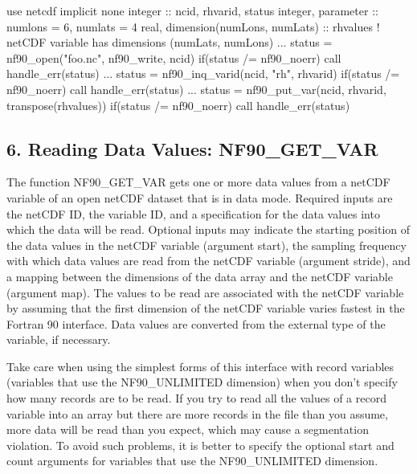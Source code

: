 \begin{DoxyCode}
\textcolor{keywordtype}{use }netcdf
\textcolor{keywordtype}{implicit none}
\textcolor{keywordtype}{integer}                           :: ncid, rhvarid, status
\textcolor{keywordtype}{integer}, \textcolor{keywordtype}{parameter}                :: numlons = 6, numlats = 4
\textcolor{keywordtype}{real}, \textcolor{keywordtype}{dimension(numLons, numLats)} :: rhvalues
\textcolor{comment}{! netCDF variable has dimensions (numLats, numLons)}
...
status = nf90\_open(\textcolor{stringliteral}{"foo.nc"}, nf90\_write, ncid)
\textcolor{keywordflow}{if}(status /= nf90\_noerr) \textcolor{keyword}{call }handle\_err(status)
...
status = nf90\_inq\_varid(ncid, \textcolor{stringliteral}{"rh"}, rhvarid)
\textcolor{keywordflow}{if}(status /= nf90\_noerr) \textcolor{keyword}{call }handle\_err(status)
...
status = nf90\_put\_var(ncid, rhvarid, transpose(rhvalues))
\textcolor{keywordflow}{if}(status /= nf90\_noerr) \textcolor{keyword}{call }handle\_err(status)
\end{DoxyCode}
\hypertarget{f90-variables_f90-reading-data-values-nf90_get_var}{}\subsection{6. Reading Data Values\+: N\+F90\+\_\+\+G\+E\+T\+\_\+\+V\+A\+R }\label{f90-variables_f90-reading-data-values-nf90_get_var}
The function N\+F90\+\_\+\+G\+E\+T\+\_\+\+V\+AR gets one or more data values from a net\+C\+DF variable of an open net\+C\+DF dataset that is in data mode. Required inputs are the net\+C\+DF ID, the variable ID, and a specification for the data values into which the data will be read. Optional inputs may indicate the starting position of the data values in the net\+C\+DF variable (argument start), the sampling frequency with which data values are read from the net\+C\+DF variable (argument stride), and a mapping between the dimensions of the data array and the net\+C\+DF variable (argument map). The values to be read are associated with the net\+C\+DF variable by assuming that the first dimension of the net\+C\+DF variable varies fastest in the Fortran 90 interface. Data values are converted from the external type of the variable, if necessary.

Take care when using the simplest forms of this interface with record variables (variables that use the N\+F90\+\_\+\+U\+N\+L\+I\+M\+I\+T\+ED dimension) when you don’t specify how many records are to be read. If you try to read all the values of a record variable into an array but there are more records in the file than you assume, more data will be read than you expect, which may cause a segmentation violation. To avoid such problems, it is better to specify the optional start and count arguments for variables that use the N\+F90\+\_\+\+U\+N\+L\+I\+M\+I\+T\+ED dimension.

